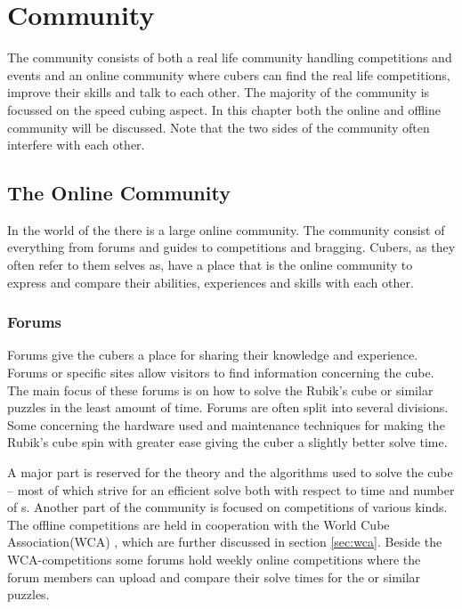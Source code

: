 \chapter{Community}

The \rubik{} community consists of both a real life community handling competitions and events and an online community where cubers can find the real life competitions, improve their skills and talk to each other. The majority of the community is focussed on the speed cubing aspect. In this chapter both the online and offline community will be discussed. Note that the two sides of the community often interfere with each other. 

\section{The Online Community}
In the world of the \rubik{} there is a large online community. The community consist of everything from forums and guides to competitions and bragging. Cubers, as they often refer to them selves as, have a place that is the online community to express and compare their abilities, experiences and skills with each other. 

\subsection{Forums}
Forums give the cubers a place for sharing their knowledge and experience\cite{speedsolving.com}\cite{speedcubing.dk}\cite{wca}. Forums or specific \rubik{} sites allow visitors to find information concerning the cube. The main focus of these forums is on how to solve the Rubik's cube or similar puzzles in the least amount of time. Forums are often split into several divisions. Some concerning the hardware used and maintenance techniques for making the Rubik's cube spin with greater ease giving the cuber a slightly better solve time.

A major part is reserved for the theory and the algorithms used to solve the cube -- most of which strive for an efficient solve both with respect to time and number of \twist{}s.
Another part of the community is focused on competitions of various kinds. The offline competitions are held in cooperation with the World Cube Association(WCA) \cite{wca}, which are further discussed in section \ref{sec:wca}. Beside the WCA-competitions some forums hold weekly online competitions where the forum members can upload and compare their solve times for the \rubik{} or similar puzzles. 


